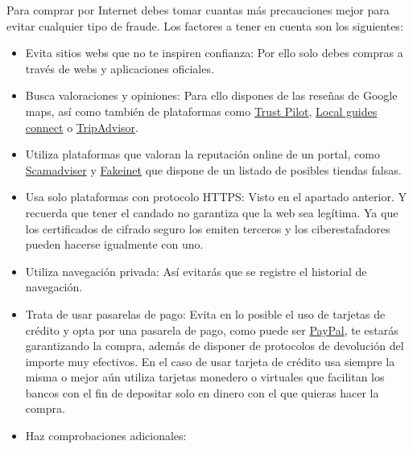 \documentclass[
  spanish,
  a4paper,
  openany]{book}
\begin{document}
Para comprar por Internet debes tomar cuantas más precauciones mejor para evitar cualquier tipo de fraude. Los factores a tener en cuenta son los siguientes:

\begin{itemize}
\item
  Evita sitios webs que no te inspiren confianza: Por ello solo debes compras a través de webs y aplicaciones oficiales.
\item
  Busca valoraciones y opiniones: Para ello dispones de las reseñas de Google maps, así como también de plataformas como \href{https://es.trustpilot.com/}{Trust Pilot}, \href{https://www.localguidesconnect.com/}{Local guides connect} o \href{https://www.tripadvisor.es/}{TripAdvisor}.
\item
  Utiliza plataformas que valoran la reputación online de un portal, como \href{https://www.scamadviser.com/}{Scamadviser} y \href{https://fakeinet.com/}{Fakeinet} que dispone de un listado de posibles tiendas falsas.
\item
  Usa solo plataformas con protocolo HTTPS: Visto en el apartado anterior. Y recuerda que tener el candado no garantiza que la web sea legítima. Ya que los certificados de cifrado seguro los emiten terceros y los ciberestafadores pueden hacerse igualmente con uno.
\item
  Utiliza navegación privada: Así evitarás que se registre el historial de navegación.
\item
  Trata de usar pasarelas de pago: Evita en lo posible el uso de tarjetas de crédito y opta por una pasarela de pago, como puede ser \href{https://www.paypal.com/es/home}{PayPal}, te estarás garantizando la compra, además de disponer de protocolos de devolución del importe muy efectivos. En el caso de usar tarjeta de crédito usa siempre la misma o mejor aún utiliza tarjetas monedero o virtuales que facilitan los bancos con el fin de depositar solo en dinero con el que quieras hacer la compra.
\item
  Haz comprobaciones adicionales:


\end{itemize}
\end{document}
